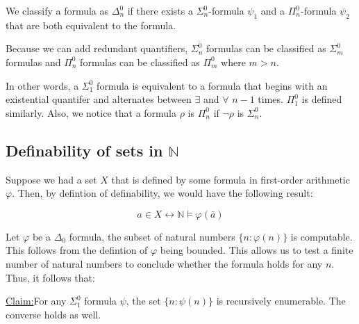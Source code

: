 \documentclass[a4paper,10pt]{article}
\newenvironment{claim}[1]{\par\noindent\underline{Claim:}\space#1}{}
\newenvironment{definition}[1][Definition]{\begin{trivlist}
\item[\hskip \labelsep {\bfseries #1}]}{\end{trivlist}}
\let\phi\varphi
\newcommand*\NN{\mathbb{N}}
\newcommand*\n{\newline\par}
\newcommand*\mo{\vDash}
\newcommand*\biject{\leftrightarrow}
\begin{document}
    \begin{definition}
     We classify a formula as $\Delta_n^0$ if there exists a $\Sigma_n^0$-formula $\psi_1$ and a $\Pi_n^0$-formula $\psi_2$ that are both equivalent to the formula.
    \end{definition}

    
    Because we can add redundant quantifiers, $\Sigma_n^0$ formulas can be classified as $\Sigma_m^0$ formulas and $\Pi_n^0$  formulas can be classified as $\Pi_m^0$ where $m > n$. \n
    
    
    In other words, a $\Sigma_1^0$ formula is equivalent to a formula that begins with an existential quantifer and alternates between $\exists$ and $\forall$ $n-1$ times. $\Pi_1^0$ is defined similarly. 
    Also, we notice that a formula $\rho$ is $\Pi_n^0$ if $\neg\rho$ is $\Sigma_n^0$.  \n
    
    \subsection{Definability of sets in $\NN$}
    
    Suppose we had a set $X$ that is defined by some formula in first-order arithmetic $\phi$. Then, by defintion of definability,  we would have the following result:
    
    \begin{equation*}
     a \in X \biject \NN \mo \phi(\bar{a})
    \end{equation*}

    Let $\phi$ be a $\Delta_0$ formula, the subset of natural numbers $\{n:\phi(n)\}$ is computable. This follows from the defintion of $\phi$ being bounded. This allows us to test a finite number of natural numbers to conclude whether the formula holds for any $n$. Thus,
    it follows that: \n
    
    
    \begin{claim}
    For any $\Sigma_1^0$ formula $\psi$, the set $\{n:\psi(n)\}$ is recursively enumerable. The converse holds as well.
    \end{claim}
    
\end{document}
